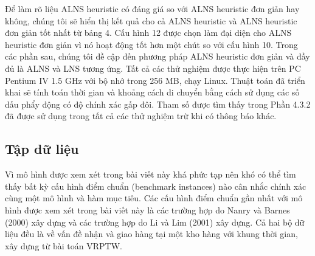 Để làm rõ liệu ALNS heuristic có đáng giá so với ALNS heuristic đơn giản hay không, chúng tôi sẽ hiển thị kết quả cho cả ALNS heuristic và ALNS heuristic đơn giản tốt nhất từ bảng 4. Cấu hình 12 được chọn làm đại diện cho ALNS heuristic đơn giản vì nó hoạt động tốt hơn một chút so với cấu hình 10. Trong các phần sau, chúng tôi đề cập đến phương pháp ALNS heuristic đơn giản và đầy đủ là ALNS và LNS tương ứng.
Tất cả các thử nghiệm được thực hiện trên PC Pentium IV 1.5 GHz với bộ nhớ trong 256 MB, chạy Linux. Thuật toán đã triển khai sẽ tính toán thời gian và khoảng cách di chuyển bằng cách sử dụng các số dấu phẩy động có độ chính xác gấp đôi. Tham số được tìm thấy trong Phần 4.3.2 đã được sử dụng trong tất cả các thử nghiệm trừ khi có thông báo khác.

\subsection{Tập dữ liệu}
Vì mô hình được xem xét trong bài viết này khá phức tạp nên khó có thể tìm thấy bất kỳ cấu hình điểm chuẩn (benchmark instances) nào cân nhắc chính xác cùng một mô hình và hàm mục tiêu. Các cấu hình điểm chuẩn gần nhất với mô hình được xem xét trong bài viết này là các trường hợp do Nanry và Barnes (2000) xây dựng và các trường hợp do Li và Lim (2001) xây dựng. Cả hai bộ dữ liệu đều là về vấn đề nhận và giao hàng tại một kho hàng với khung thời gian, xây dựng từ bài toán VRPTW.

